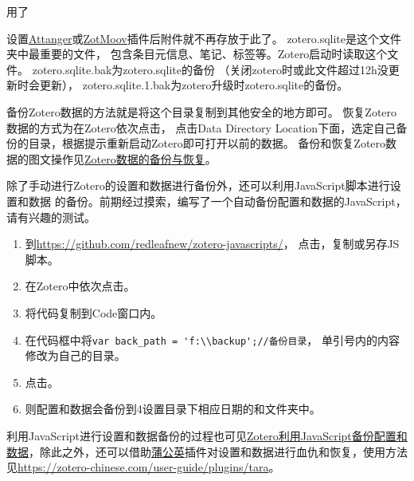 \documentclass[theorem=false,mathfont=none,openany,sub3section]{easybook}
\begin{document}
用了{设置\href{https://github.com/MuiseDestiny/zotero-attanger}{Attanger}或\href{https://github.com/wileyyugioh/zotmoov}{ZotMoov}插件后附件就不再存放于此了。
zotero.sqlite是这个文件夹中最重要的文件，
包含条目元信息、笔记、标签等。Zotero启动时读取这个文件。
zotero.sqlite.bak为zotero.sqlite的备份
（关闭zotero时或此文件超过12h没更新时会更新），
zotero.sqlite.1.bak为zotero升级时zotero.sqlite的备份。

备份Zotero数据的方法就是将这个目录复制到其他安全的地方即可。
恢复Zotero数据的方式为在Zotero依次点击，
点击Data Directory Location下面，选定自己备份的目录，根据提示重新启动Zotero即可打开以前的数据。
备份和恢复Zotero数据的图文操作见\href{https://zhuanlan.zhihu.com/p/350549136}
{Zotero数据的备份与恢复}。

除了手动进行Zotero的设置和数据进行备份外，还可以利用JavaScript脚本进行设置和数据
的备份。前期经过摸索，编写了一个自动备份配置和数据的JavaScript，请有兴趣的测试。
\begin{enumerate}
	\item 到\href{https://github.com/redleafnew/zotero-javascripts/blob/main/8back%20up%20profile%20and%20data.js}
	{https://github.com/redleafnew/zotero-javascripts/}，
	点击，复制或另存JS脚本。
	\item 在Zotero中依次点击。
	\item 将代码复制到Code窗口内。
	\item 在代码框中将\verb|var back_path = 'f:\\backup';//备份目录|，
	单引号内的内容修改为自己的目录。
	\item 点击。
	\item 则配置和数据会备份到4设置目录下相应日期的和文件夹中。
\end{enumerate}

利用JavaScript进行设置和数据备份的过程也可见\href{https://zhuanlan.zhihu.com/p/357859432}
{Zotero利用JavaScript备份配置和数据}，除此之外，还可以借助\href{https://github.com/l0o0/tara}{蒲公英}插件对设置和数据进行血仇和恢复，使用方法见\url{https://zotero-chinese.com/user-guide/plugins/tara}。

}
\end{document}
